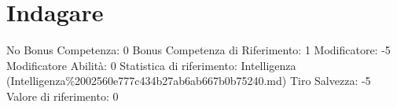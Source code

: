 \section{Indagare}\label{indagare}

\begin{description}
\tightlist
\item[Tags: ABI]
No Bonus Competenza: 0 Bonus Competenza di Riferimento: 1 Modificatore:
-5 Modificatore Abilità: 0 Statistica di riferimento: Intelligenza
(Intelligenza\%2002560e777c434b27ab6ab667b0b75240.md) Tiro Salvezza: -5
Valore di riferimento: 0
\end{description}
